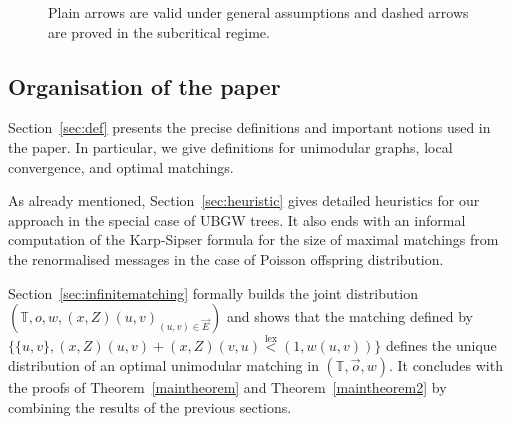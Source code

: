 \documentclass[11pt]{article}
\DeclareMathOperator{\lex}{lex}
\newcommand{\eps}{\varepsilon}
\begin{document}
\begin{figure} \label{fig:diagram}
\begin{center}
\end{center}
\caption{Plain arrows are valid under general assumptions and dashed arrows are proved in the subcritical regime.}
\end{figure}



\subsection{Organisation of the paper}
Section~\ref{sec:def} presents the precise definitions and important notions used in the paper. In particular, we give definitions for unimodular graphs, local convergence, and optimal matchings.

As already mentioned, Section~\ref{sec:heuristic} gives detailed heuristics for our approach in the special case of UBGW trees. It also ends with an informal computation of the Karp-Sipser formula for the size of maximal matchings from the renormalised messages in the case of Poisson offspring distribution.



Section~\ref{sec:infinitematching} formally builds the joint distribution $\left(\mathbb{T},o,w,(x,Z)(u,v)_{(u,v) \in \overset{\rightarrow}{E}}\right)$ and shows that the matching defined by $\big\{\{u,v\}, (x,Z)(u,v)+(x,Z)(v,u)  \overset{\lex}{<} (1,w(u,v))\big\}$
defines the unique distribution of an optimal unimodular matching in $(\mathbb{T},\overset{\rightarrow}{o},w)$.
It concludes with the proofs of Theorem~\ref{maintheorem} and Theorem~\ref{maintheorem2} by combining the results of the previous sections.
\end{document}
